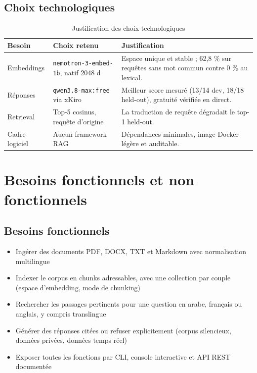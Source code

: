 \documentclass[a4paper,12pt]{report}
\begin{document}
\subsection{Choix technologiques}
\begin{table}[H]
\centering
\begin{tabular}{|l|p{4cm}|p{5.5cm}|}
\hline
Besoin & Choix retenu & Justification \\
\hline
Embeddings & \texttt{nemotron-3-embed-1b}, natif 2048 d & Espace unique et stable ; 62,8 \% sur requ\^etes sans mot commun contre 0 \% au lexical. \\
\hline
R\'eponses & \texttt{qwen3.8-max:free} via xKiro & Meilleur score mesur\'e (13/14 dev, 18/18 held-out), gratuit\'e v\'erifi\'ee en direct. \\
\hline
Retrieval & Top-5 cosinus, requ\^ete d'origine & La traduction de requ\^ete d\'egradait le top-1 held-out. \\
\hline
Cadre logiciel & Aucun framework RAG & D\'ependances minimales, image Docker l\'eg\`ere et auditable. \\
\hline
\end{tabular}
\caption{Justification des choix technologiques}
\end{table}

\section{Besoins fonctionnels et non fonctionnels}

\subsection{Besoins fonctionnels}
\begin{itemize}
    \item Ing\'erer des documents PDF, DOCX, TXT et Markdown avec normalisation multilingue
    \item Indexer le corpus en chunks adressables, avec une collection par couple (espace d'embedding, mode de chunking)
    \item Rechercher les passages pertinents pour une question en arabe, fran\c{c}ais ou anglais, y compris translingue
    \item G\'en\'erer des r\'eponses cit\'ees ou refuser explicitement (corpus silencieux, donn\'ees priv\'ees, donn\'ees temps r\'eel)
    \item Exposer toutes les fonctions par CLI, console interactive et API REST document\'ee
\end{itemize}
\end{document}
